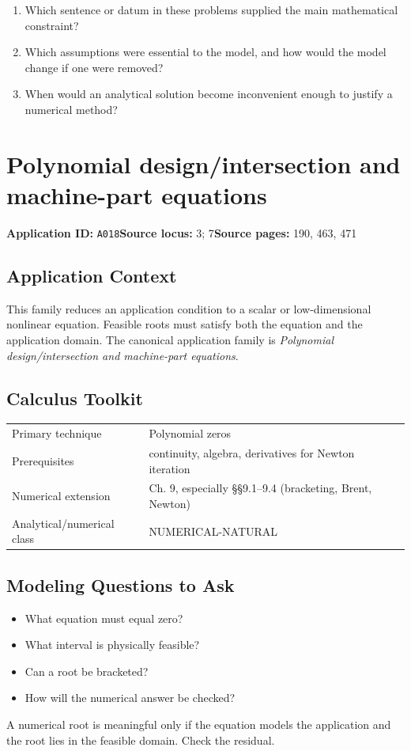 \documentclass[11pt]{book}
\newcommand{\pid}[1]{\texttt{#1}}
\begin{document}
\begin{reflectionbox}\begin{enumerate}
\item Which sentence or datum in these problems supplied the main mathematical constraint?
\item Which assumptions were essential to the model, and how would the model change if one were removed?
\item When would an analytical solution become inconvenient enough to justify a numerical method?
\end{enumerate}\end{reflectionbox}
\chapter{Polynomial design/intersection and machine-part equations}\label{app:A018}
\textbf{Application ID:} \pid{A018}\quad \textbf{Source locus:} 3; 7\quad \textbf{Source pages:} 190, 463, 471
\section*{Application Context}
This family reduces an application condition to a scalar or low-dimensional nonlinear equation. Feasible roots must satisfy both the equation and the application domain. The canonical application family is \emph{Polynomial design/intersection and machine-part equations}.
\section*{Calculus Toolkit}
\begin{tabularx}{\textwidth}{@{}lX@{}}\toprule
Primary technique & Polynomial zeros \\
Prerequisites & continuity, algebra, derivatives for Newton iteration \\
Numerical extension & Ch. 9, especially §§9.1–9.4 (bracketing, Brent, Newton) \\
Analytical/numerical class & NUMERICAL-NATURAL \\
\bottomrule\end{tabularx}
\section*{Modeling Questions to Ask}\begin{itemize}
\item What equation must equal zero?
\item What interval is physically feasible?
\item Can a root be bracketed?
\item How will the numerical answer be checked?
\end{itemize}
\begin{errorbox}A numerical root is meaningful only if the equation models the application and the root lies in the feasible domain. Check the residual.\end{errorbox}
\end{document}
